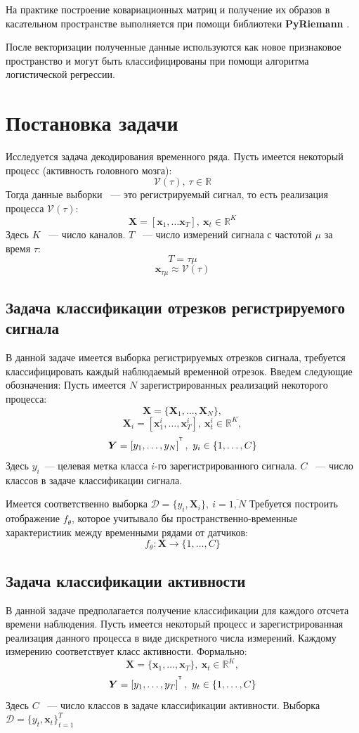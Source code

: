 \documentclass[a4paper, 12pt]{extarticle}
\begin{document}
На практике построение ковариационных матриц и получение их образов в касательном пространстве выполняется 
при помощи библиотеки \textbf{PyRiemann} \citep{congedo2013new}.

После векторизации полученные данные используются как новое признаковое пространство и 
могут быть классифицированы при помощи алгоритма логистической регрессии. 

\section{Постановка задачи}
Исследуется задача декодирования временного ряда. Пусть имеется некоторый процесс (активность головного мозга):
$$\mathcal{V}(\tau),~\tau \in \mathbb{R}$$
Тогда данные выборки ~--- это регистрируемый сигнал, то есть реализация процесса $\mathcal{V}(\tau)$:
$$\bm{X} = \left[\bm{x}_1,\dots \bm{x}_{T}\right],~\bm{x}_t \in \mathbb{R}^K$$
Здесь $K$ ~--- число каналов. $T$ ~--- число измерений сигнала с частотой $\mu$ за время $\tau$:
$$T = \tau \mu$$
$$\bm{x}_{\tau \mu} \approx \mathcal{V}(\tau)$$
\subsection{Задача классификации отрезков регистрируемого сигнала}
В данной задаче имеется выборка регистрируемых отрезков сигнала, 
требуется классифицировать каждый наблюдаемый временной отрезок. 
Введем следующие обозначения:
Пусть имеется $N$ зарегистрированных реализаций некоторого процесса:
$$\bm{X} = \{\bm{X}_1,\dots, \bm{X}_N\},$$
$$\bm{X}_i = \left[\bm{x}^i_1,\dots, \bm{x}^i_{T}\right], ~\bm{x}^i_t \in \mathbb{R}^K,$$
$$\bm{Y} = \left[y_1, \dots, y_{N}\right]^{^{\mathsf{T}}},~y_i \in \{1,\dots, C\}$$
Здесь $y_i$~--- целевая метка класса $i$-го зарегистрированного сигнала. $C$ ~--- число классов в задаче классификации сигнала. 

Имеется соответственно выборка $\mathcal{D} = \{y_i, \bm{X}_i\},~  i = \overline{1,N}$
Требуется построить отображение $f_\theta$, которое учитывало 
бы пространственно-временные характеристиик между временными рядами от датчиков:
$$f_\theta: \bm{X} \rightarrow \{1,\dots, C\}$$ 
\subsection{Задача классификации активности}
В данной задаче предполагается получение классификации для каждого отсчета 
времени наблюдения.
Пусть имеется некоторый процесс и зарегистрированная реализация данного 
процесса в виде дискретного числа измерений. Каждому измерению соответствует
класс активности. Формально:
$$\bm{X} = \{\bm{x}_1,\dots, \bm{x}_{T}\}, ~\bm{x}_t \in \mathbb{R}^K,$$
$$\bm{Y} = \left[y_1, \dots, y_{T}\right]^{^{\mathsf{T}}},~y_t \in \{1,\dots, C\}$$
Здесь $C$ ~--- число классов в задаче классификации активности. 
Выборка $\mathcal{D} = \{y_t, \bm{x}_t\}_{t=1}^T$
\end{document}
